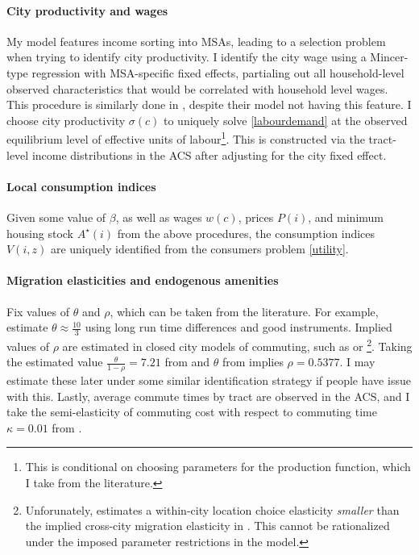 \documentclass[]{article}
\begin{document}
\paragraph*{City productivity and wages} My model features income sorting into MSAs, leading to a selection problem when trying to identify city productivity. I identify the city wage using a Mincer-type regression with MSA-specific fixed effects, partialing out all household-level observed characteristics that would be correlated with household level wages. This procedure is similarly done in \cite{hseihmoretti}, despite their model not having this feature. I choose city productivity $\sigma(c)$ to uniquely solve \eqref{labourdemand} at the observed equilibrium level of effective units of labour\footnote{This is conditional on choosing parameters for the production function, which I take from the literature.}. This is constructed via the tract-level income distributions in the ACS after adjusting for the city fixed effect. 

\paragraph*{Local consumption indices} Given some value of $\beta$, as well as wages $w(c)$, prices $P(i)$, and minimum housing stock $A^{\star}(i)$ from the above procedures, the consumption indices $V(i, z)$ are uniquely identified from the consumers problem \eqref{utility}. 


\paragraph*{Migration elasticities and endogenous amenities} Fix values of $\theta$ and $\rho$, which can be taken from the literature. For example, \cite{morettihornbeck} estimate $\theta \approx \frac{10}{3}$ using long run time differences and good instruments. Implied values of $\rho$ are estimated in closed city models of commuting, such as \cite{herzog2022} or \cite{severen2021}\footnote{Unforunately, \cite{severen2021} estimates a within-city location choice elasticity \textit{smaller} than the implied cross-city migration elasticity in \cite{morettihornbeck}. This cannot be rationalized under the imposed parameter restrictions in the model.}. Taking the estimated value $\frac{\theta}{1-\rho} = 7.21$ from \cite{herzog2022} and $\theta$ from \cite{morettihornbeck} implies $\rho = 0.5377$. I may estimate these later under some similar identification strategy if people have issue with this. Lastly, average commute times by tract are observed in the ACS, and I take the semi-elasticity of commuting cost with respect to commuting time $\kappa = 0.01$ from \cite{berlinwall}. 
\end{document}
